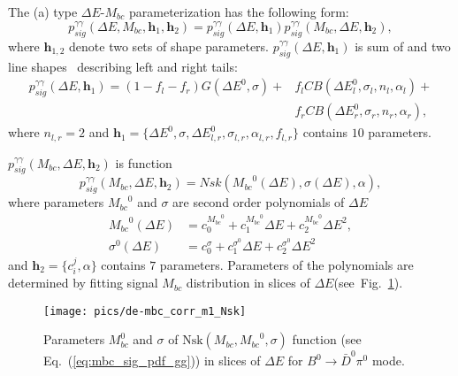 \documentclass[preprint,aps,showpacs]{revtex4}
\newcommand{\bdpi}{\ensuremath{B^0\to \bar D^0\pi^0}\xspace}
\newcommand{\btodsteta}{\ensuremath{B^0\to \bar D^{*0}\eta}\xspace}
\newcommand{\de}{\ensuremath{\Delta E}\xspace}
\newcommand{\mbc}{\ensuremath{M_{bc}}\xspace}
\begin{document}
The (a) type \de-\mbc parameterization has the following form:
\begin{equation}\label{eq:de_mbc_sig_gg}
 p_{sig}^{\gamma\gamma}(\de,\mbc,\mathbf{h}_1,\mathbf{h}_2) = p_{sig}^{\gamma\gamma}(\de,\mathbf{h}_1)p_{sig}^{\gamma\gamma}(\mbc,\de,\mathbf{h}_2),
\end{equation}
where $\mathbf{h}_{1,2}$ denote two sets of shape parameters.
$p_{sig}^{\gamma\gamma}(\de,\mathbf{h}_1)$ is sum of \verb@Gaussian@ and two \verb@CrystallBall@ line shapes~\cite{CB} describing left and right tails:
\begin{equation}\label{eq:de_sig_pdf_gg}
\begin{split}
 p_{sig}^{\gamma\gamma}(\de,\mathbf{h}_1) = (1-f_l-f_r)G(\de^0,\sigma)+&f_lCB(\de^0_l,\sigma_l,n_l,\alpha_l)+\\
 &f_rCB(\de^0_r,\sigma_r,n_r,\alpha_r),
\end{split}
\end{equation}
where $n_{l,r} = 2$ and $\mathbf{h}_1=\{\de^0,\sigma,\de^0_{l,r},\sigma_{l,r},\alpha_{l,r},f_{l,r}\}$ contains $10$ parameters. %

$p_{sig}^{\gamma\gamma}(\mbc,\de,\mathbf{h}_2)$ is \verb@Novosibirsk@ function \cite{NskPdf}
\begin{equation}\label{eq:mbc_sig_pdf_gg}
 p_{sig}^{\gamma\gamma}(\mbc,\de,\mathbf{h}_2) = Nsk\left(\mbc^0(\de),\sigma(\de),\alpha\right),
\end{equation}
where parameters $\mbc^0$ and $\sigma$ are second order polynomials of \de
\begin{equation}\label{eq:de_mbc_sig_gg_corr}
\begin{split}
   \mbc^0(\de) &= c_0^{\mbc^0} + c_1^{\mbc^0}\de + c_2^{\mbc^0}\de^2,\\
 \sigma^0(\de) &= c_0^{\sigma} + c_1^{\sigma^0}\de + c_2^{\sigma^0}\de^2
\end{split}
\end{equation}
and $\mathbf{h}_2=\{c_{i}^{j},\alpha\}$ contains $7$ parameters. Parameters of the polynomials are determined by fitting signal \mbc distribution in slices of \de (see~Fig.~\ref{fig:de-mbc-corr}). %

\begin{figure}[htb]
 \texttt{[image: pics/de-mbc\_corr\_m1\_Nsk]}
 \caption{Parameters $M_{bc}^0$ and $\sigma$ of $\text{Nsk}(\mbc,\mbc^0,\sigma)$ function (see Eq.~(\ref{eq:mbc_sig_pdf_gg})) in slices of \de for \bdpi mode.}
\label{fig:de-mbc-corr}
\end{figure}
\end{document}
